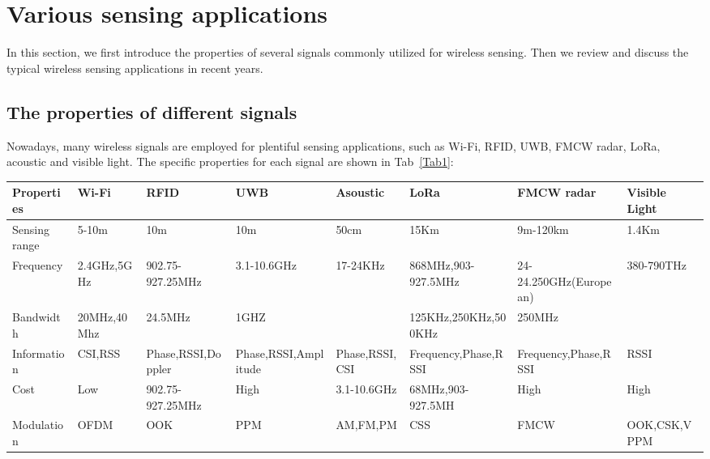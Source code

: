 \section {Various sensing applications}

In this section, we first introduce the properties of several signals commonly utilized for wireless sensing. Then we review and discuss the typical wireless sensing applications in recent years.

\subsection {The properties of different signals}
Nowadays, many wireless signals are employed for plentiful sensing applications, such as Wi-Fi, RFID, UWB, FMCW radar, LoRa, acoustic and visible light. The specific properties for each signal are shown in Tab~\ref{Tab1}:

\renewcommand\arraystretch{2}
\begin{table*}\tiny
\caption{Different wireless signals with different properties.}
\label{Tab1}
\setlength{\tabcolsep}{7mm}
\begin{tabular}{|p{0.5cm}|p{0.5cm}<{\raggedright}|p{0.9cm}<{\raggedright}|p{1.0cm}<{\raggedright}|p{0.6cm}<{\raggedright}|p{1.2cm}<{\raggedright}|p{0.9cm}<{\raggedright}|p{0.6cm}<{\raggedright}|}
\hline
Properties & Wi-Fi & RFID & UWB & Asoustic & LoRa & FMCW radar & Visible Light \\
\hline
Sensing range & 5-10m & 10m & 10m & 50cm & 15Km & 9m-120km & 1.4Km\\
\hline
Frequency & 2.4GHz,5GHz & 902.75-927.25MHz & 3.1-10.6GHz & 17-24KHz & 868MHz,903-927.5MHz & 24-24.250GHz(European) & 380-790THz\\
\hline
Bandwidth & 20MHz,40Mhz & 24.5MHz & 1GHZ &  & 125KHz,250KHz,500KHz & 250MHz & \\
\hline
Information & CSI,RSS & Phase,RSSI,Doppler & Phase,RSSI,Amplitude & Phase,RSSI,CSI & Frequency,Phase,RSSI & Frequency,Phase,RSSI & RSSI\\
\hline
Cost & Low & 902.75-927.25MHz & High & 3.1-10.6GHz & 68MHz,903-927.5MH & High & High\\
\hline
Modulation & OFDM & OOK & PPM & AM,FM,PM & CSS& FMCW & OOK,CSK,VPPM\\
\hline
\end{tabular}
\end{table*}

